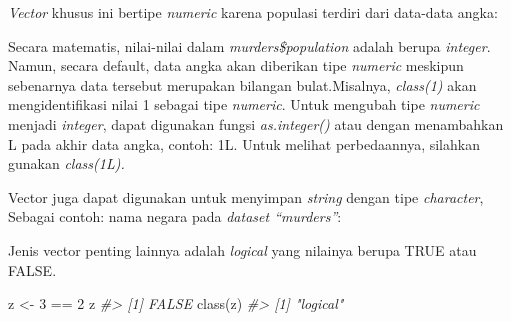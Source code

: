 \documentclass[
]{article}
\newenvironment{Shaded}{\begin{snugshade}}{\end{snugshade}}
\newcommand{\CommentTok}[1]{\textcolor[rgb]{0.56,0.35,0.01}{\textit{#1}}}
\newcommand{\DecValTok}[1]{\textcolor[rgb]{0.00,0.00,0.81}{#1}}
\newcommand{\FunctionTok}[1]{\textcolor[rgb]{0.00,0.00,0.00}{#1}}
\newcommand{\NormalTok}[1]{#1}
\newcommand{\OtherTok}[1]{\textcolor[rgb]{0.56,0.35,0.01}{#1}}
\newcommand{\SpecialCharTok}[1]{\textcolor[rgb]{0.00,0.00,0.00}{#1}}
\begin{document}
\begin{Shaded}
\end{Shaded}

\emph{Vector} khusus ini bertipe \emph{numeric} karena populasi terdiri
dari data-data angka:

\begin{Shaded}
\end{Shaded}

Secara matematis, nilai-nilai dalam \emph{murders\$population} adalah
berupa \emph{integer}. Namun, secara default, data angka akan diberikan
tipe \emph{numeric} meskipun sebenarnya data tersebut merupakan bilangan
bulat.Misalnya, \emph{class(1)} akan mengidentifikasi nilai 1 sebagai
tipe \emph{numeric}. Untuk mengubah tipe \emph{numeric} menjadi
\emph{integer}, dapat digunakan fungsi \emph{as.integer()} atau dengan
menambahkan L pada akhir data angka, contoh: 1L. Untuk melihat
perbedaannya, silahkan gunakan \emph{class(1L).}

Vector juga dapat digunakan untuk menyimpan \emph{string} dengan tipe
\emph{character}, Sebagai contoh: nama negara pada \emph{dataset
``murders''}:

\begin{Shaded}
\end{Shaded}

Jenis vector penting lainnya adalah \emph{logical} yang nilainya berupa
TRUE atau FALSE.

\begin{Shaded}
\begin{Highlighting}[]
\NormalTok{z }\OtherTok{\textless{}{-}} \DecValTok{3} \SpecialCharTok{==} \DecValTok{2} 
\NormalTok{z }
\CommentTok{\#\textgreater{} [1] FALSE }
\FunctionTok{class}\NormalTok{(z) }
\CommentTok{\#\textgreater{} [1] "logical"}
\end{Highlighting}
\end{Shaded}
\end{document}
